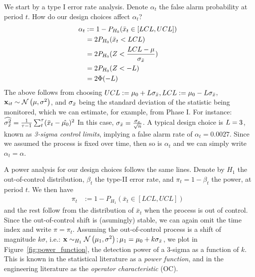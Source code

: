We start by a type I error rate analysis. 
Denote $\alpha_t$ the false alarm probability at period $t$.
How do our design choices affect $\alpha_t$?
\begin{align}
	\alpha_t &:= 1-P_{H_0}(\bar{x}_t \in [LCL,UCL]) \\
	&= 2 P_{H_0}(\bar{x}_t < LCL) \\
	&= 2 P_{H_0}(Z<\frac{LCL-\mu}{\sigma_{\bar{x}}}) \\
	&= 2 P_{H_0}(Z < -L) \\
	&= 2 \Phi(-L)
\end{align}
The above follows from choosing $UCL:=\mu_0 + L \sigma_{\bar{x}}, LCL:= \mu_0 - L \sigma_{\bar{x}}$, $\mathbf{x}_{it}\sim \mathcal{N}\left(\mu,\sigma^2\right)$, and $\sigma_{\bar{x}}$ being the standard deviation of the statistic being monitored, which we can estimate, for example, from Phase I. 
For instance: 
$\widehat{\sigma_{\bar{x}}^2}=\frac{1}{\tau-1} \sum_t^\tau (\bar{x}_t- \hat{\mu_0})^2 $
In this case, $\sigma_{\bar{x}}=\frac{\sigma_x}{\sqrt{n}}$.
A typical design choice is $L=3$, known as \emph{3-sigma control limits}, implying a false alarm rate of $\alpha_t=0.0027$.
Since we assumed the process is fixed over time, then so is $\alpha_t$ and we can simply write $\alpha_t=\alpha$.

A power analysis for our design choices follows the same lines.
Denote by $H_1$ the out-of-control distribution,  $\beta_t$ the type-II error rate, and $\pi_t=1-\beta_t$ the power, at period $t$.
We then have
\begin{align}
	\pi_t &:= 1-P_{H_1}(\bar{x}_t \in [LCL,UCL])
\end{align}
and the rest follow from the distribution of $\bar{x}_t$ when the process is out of control.
Since the out-of-control shift is (asumingly) stable, we can again omit the time index and write $\pi=\pi_t$.
Assuming the out-of-control process is a shift of magnitude $k \sigma$, i.e.: 
$\mathbf{x} \sim_{H_1} \mathcal{N}\left(\mu_1,\sigma^2\right); \mu_1=\mu_0+ k \sigma_{\bar{x}}$, we plot in Figure~\ref{fig:power_function}, the detection power of a 3-sigma \barxChart as a function of $k$. 
This is known in the statistical literature as a \emph{power function}, and in the engineering literature as the \emph{operator characteristic} (OC).


